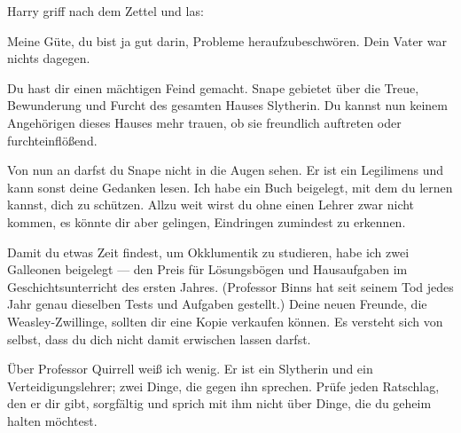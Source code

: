 Harry griff nach dem Zettel und las:

\begin{writtenNote}
Meine Güte, du bist ja gut darin, Probleme heraufzubeschwören. Dein Vater war nichts dagegen.

Du hast dir einen mächtigen Feind gemacht. Snape gebietet über die Treue, Bewunderung und Furcht des gesamten Hauses Slytherin. Du kannst nun keinem Angehörigen dieses Hauses mehr trauen, ob sie freundlich auftreten oder furchteinflößend.

Von nun an darfst du Snape nicht in die Augen sehen. Er ist ein Legilimens und kann sonst deine Gedanken lesen. Ich habe ein Buch beigelegt, mit dem du lernen kannst, dich zu schützen. Allzu weit wirst du ohne einen Lehrer zwar nicht kommen, es könnte dir aber gelingen, Eindringen zumindest zu erkennen.

Damit du etwas Zeit findest, um Okklumentik zu studieren, habe ich zwei Galleonen beigelegt — den Preis für Lösungsbögen und Hausaufgaben im Geschichtsunterricht des ersten Jahres. (Professor Binns hat seit seinem Tod jedes Jahr genau dieselben Tests und Aufgaben gestellt.) Deine neuen Freunde, die Weasley-Zwillinge, sollten dir eine Kopie verkaufen können. Es versteht sich von selbst, dass du dich nicht damit erwischen lassen darfst.

Über Professor Quirrell weiß ich wenig. Er ist ein Slytherin und ein Verteidigungslehrer; zwei Dinge, die gegen ihn sprechen. Prüfe jeden Ratschlag, den er dir gibt, sorgfältig und sprich mit ihm nicht über Dinge, die du geheim halten möchtest.


\end{writtenNote}
